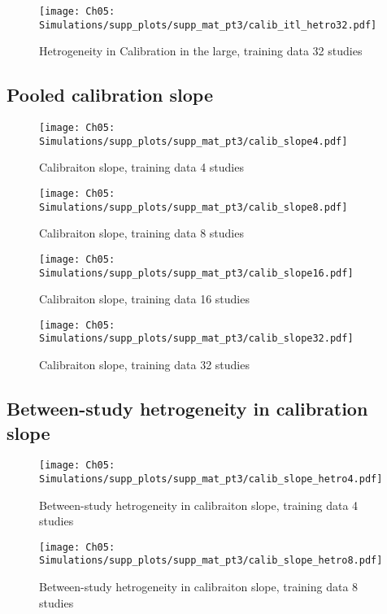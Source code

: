 \begin{figure}[H]
  \centering
  \texttt{[image: Ch05: Simulations/supp\_plots/supp\_mat\_pt3/calib\_itl\_hetro32.pdf]}
  \caption{Hetrogeneity in Calibration in the large, training data 32 studies}
\end{figure}

\subsection{Pooled calibration slope}
\begin{figure}[H]
  \centering
  \texttt{[image: Ch05: Simulations/supp\_plots/supp\_mat\_pt3/calib\_slope4.pdf]}
  \caption{Calibraiton slope, training data 4 studies}
\end{figure}

\begin{figure}[H]
  \centering
  \texttt{[image: Ch05: Simulations/supp\_plots/supp\_mat\_pt3/calib\_slope8.pdf]}
  \caption{Calibraiton slope, training data 8 studies}
\end{figure}

\begin{figure}[H]
  \centering
  \texttt{[image: Ch05: Simulations/supp\_plots/supp\_mat\_pt3/calib\_slope16.pdf]}
  \caption{Calibraiton slope, training data 16 studies}
\end{figure}

\begin{figure}[H]
  \centering
  \texttt{[image: Ch05: Simulations/supp\_plots/supp\_mat\_pt3/calib\_slope32.pdf]}
  \caption{Calibraiton slope, training data 32 studies}
\end{figure}

\subsection{Between-study hetrogeneity in calibration slope}
\begin{figure}[H]
  \centering
  \texttt{[image: Ch05: Simulations/supp\_plots/supp\_mat\_pt3/calib\_slope\_hetro4.pdf]}
  \caption{Between-study hetrogeneity in calibraiton slope, training data 4 studies}
\end{figure}

\begin{figure}[H]
  \centering
  \texttt{[image: Ch05: Simulations/supp\_plots/supp\_mat\_pt3/calib\_slope\_hetro8.pdf]}
  \caption{Between-study hetrogeneity in calibraiton slope, training data 8 studies}
\end{figure}

